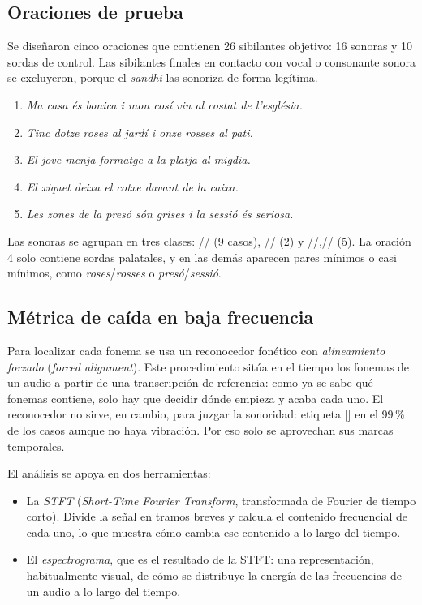 \documentclass[conference]{IEEEtran}
\newcommand{\fz}{\textipa{z}}
\newcommand{\fdz}{\textipa{dz}}
\newcommand{\fZ}{\textipa{Z}}
\newcommand{\fdZ}{\textipa{dZ}}
\begin{document}
\subsection{Oraciones de prueba}
Se diseñaron cinco oraciones que contienen 26 sibilantes objetivo: 16 sonoras y 10 sordas de control. Las sibilantes finales en contacto con vocal o consonante sonora se excluyeron, porque el \textit{sandhi} las sonoriza de forma legítima.
\begin{enumerate}
\item \textit{Ma casa és bonica i mon cosí viu al costat de l'església.}
\item \textit{Tinc dotze roses al jardí i onze rosses al pati.}
\item \textit{El jove menja formatge a la platja al migdia.}
\item \textit{El xiquet deixa el cotxe davant de la caixa.}
\item \textit{Les zones de la presó són grises i la sessió és seriosa.}
\end{enumerate}
Las sonoras se agrupan en tres clases: /\fz/ (9 casos), /\fdz/ (2) y /\fZ/,/\fdZ/ (5). La oración 4 solo contiene sordas palatales, y en las demás aparecen pares mínimos o casi mínimos, como \textit{roses}/\textit{rosses} o \textit{presó}/\textit{sessió}.

\subsection{Métrica de caída en baja frecuencia}
Para localizar cada fonema se usa un reconocedor fonético con \emph{alineamiento forzado} (\textit{forced alignment}). Este procedimiento sitúa en el tiempo los fonemas de un audio a partir de una transcripción de referencia: como ya se sabe qué fonemas contiene, solo hay que decidir dónde empieza y acaba cada uno. El reconocedor no sirve, en cambio, para juzgar la sonoridad: etiqueta [\fz] en el 99\,\% de los casos aunque no haya vibración. Por eso solo se aprovechan sus marcas temporales.

El análisis se apoya en dos herramientas:
\begin{itemize}
\item La \emph{STFT} (\textit{Short-Time Fourier Transform}, transformada de Fourier de tiempo corto). Divide la señal en tramos breves y calcula el contenido frecuencial de cada uno, lo que muestra cómo cambia ese contenido a lo largo del tiempo.
\item El \emph{espectrograma}, que es el resultado de la STFT: una representación, habitualmente visual, de cómo se distribuye la energía de las frecuencias de un audio a lo largo del tiempo.
\end{itemize}
\end{document}
